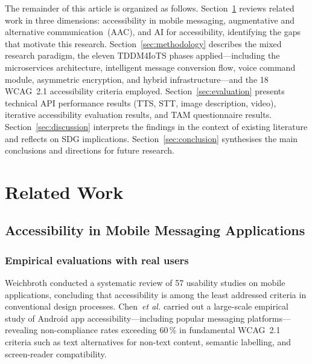 \documentclass[journal]{IEEEtran}
\begin{document}
	The remainder of this article is organized as follows.
	Section~\ref{sec:related} reviews related work in three dimensions:
	accessibility in mobile messaging, augmentative and alternative
	communication~(AAC), and AI for accessibility, identifying the gaps
	that motivate this research.
	Section~\ref{sec:methodology} describes the mixed research paradigm,
	the eleven TDDM4IoTS phases applied---including the microservices
	architecture, intelligent message conversion flow, voice command
	module, asymmetric encryption, and hybrid infrastructure---and
	the 18 WCAG~2.1 accessibility criteria employed.
	Section~\ref{sec:evaluation} presents technical API performance
	results (TTS, STT, image description, video), iterative
	accessibility evaluation results, and TAM questionnaire results.
	Section~\ref{sec:discussion} interprets the findings in the context
	of existing literature and reflects on SDG implications.
	Section~\ref{sec:conclusion} synthesises the main conclusions and
	directions for future research.
	
	\section{Related Work}
	\label{sec:related}
	
	\subsection{Accessibility in Mobile Messaging Applications}
	
	\subsubsection{Empirical evaluations with real users}
	Weichbroth \cite{weichbroth2020} conducted a systematic review of
	57 usability studies on mobile applications, concluding that
	accessibility is among the least addressed criteria in conventional
	design processes.
	Chen~\textit{et al.} \cite{chen2022} carried out a large-scale
	empirical study of Android app accessibility---including popular
	messaging platforms---revealing non-compliance rates exceeding
	60\,\% in fundamental WCAG~2.1 criteria such as text alternatives
	for non-text content, semantic labelling, and screen-reader
	compatibility.
	
\end{document}

